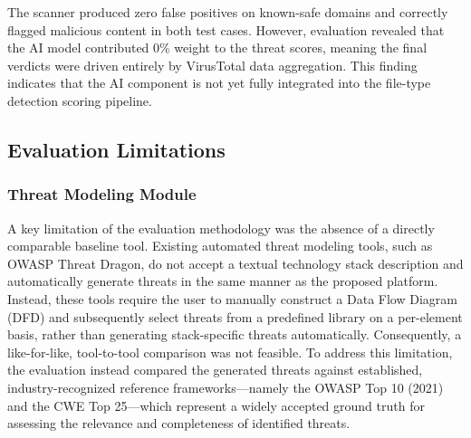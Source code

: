 \documentclass[12pt, a4paper]{article}
\begin{document}
\begin{table}[H]
\centering
\caption{URL and File Threat Detection --- Comparative Scan Results}
\label{tab:vt_scans}
\small
\renewcommand{\arraystretch}{1.3}
\end{table}

The scanner produced zero false positives on known-safe domains and correctly flagged malicious content in both test cases. However, evaluation revealed that the AI model contributed 0\% weight to the threat scores, meaning the final verdicts were driven entirely by VirusTotal data aggregation. This finding indicates that the AI component is not yet fully integrated into the file-type detection scoring pipeline.

\subsection{Evaluation Limitations}

\subsubsection{Threat Modeling Module}
A key limitation of the evaluation methodology was the absence of a directly comparable baseline tool. Existing automated threat modeling tools, such as OWASP Threat Dragon, do not accept a textual technology stack description and automatically generate threats in the same manner as the proposed platform. Instead, these tools require the user to manually construct a Data Flow Diagram (DFD) and subsequently select threats from a predefined library on a per-element basis, rather than generating stack-specific threats automatically. Consequently, a like-for-like, tool-to-tool comparison was not feasible. To address this limitation, the evaluation instead compared the generated threats against established, industry-recognized reference frameworks---namely the OWASP Top 10 (2021) and the CWE Top 25---which represent a widely accepted ground truth for assessing the relevance and completeness of identified threats.
\end{document}
